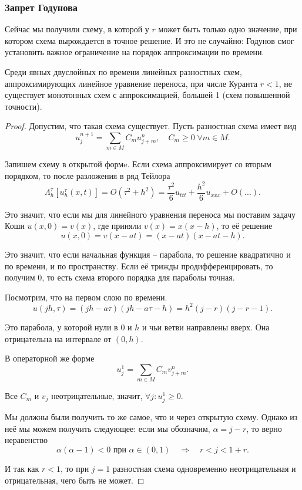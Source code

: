 \documentclass{article}
\begin{document}
\subsubsection{Запрет Годунова}
Сейчас мы получили схему, в которой у $r$ может быть только одно значение, при
котором схема вырождается в точное решение. И это не случайно: Годунов смог
установить важное ограничение на порядок аппроксимации по времени.

\begin{theorem}
	Среди явных двуслойных по времени линейных разностных схем,
	аппроксимирующих линейное уравнение переноса, при числе Куранта
	$r<1$, не существует монотонных схем с аппроксимацией, большей 1
	(схем повышенной точности).
\end{theorem}

\begin{proof}
	Допустим, что такая схема существует. Пусть разностная схема имеет вид
	\[u_j^{n+1}=\sum_{m\in M}C_m u_{j+m}^n,\quad C_m\ge 0\;\forall m\in M.\]

	Запишем схему в открытой формe. Если схема аппроксимирует со вторым
	порядком, то после разложения в ряд Тейлора
	\[\Lambda_h^\tau[u_h^\tau(x,t)]=O(\tau^2+h^2)=
	\frac{\tau^2}{6}u_{ttt}+\frac{h^2}{6}u_{xxx}+O(...).\]

	Это значит, что если мы для линейного уравнения переноса мы поставим
	задачу Коши $u(x,0)=v(x)$, где приняли $v(x)=x(x-h)$, то её решение
	\[u(x,0)=v(x-at)=(x-at)(x-at-h).\]

	Это значит, что если начальная функция -- парабола, то решение
	квадратично и по времени, и по пространству. Если её трижды
	продифференцировать, то получим 0, то есть схема второго порядка для
	параболы точная.

	Посмотрим, что на первом слою по времени.
	\[u(jh,\tau)=(jh-a\tau)(jh-a\tau-h)=h^2(j-r)(j-r-1).\]

	Это парабола, у которой нули в 0 и $h$ и чьи ветви направлены вверх. Она
	отрицательна на интервале от $(0,h)$.

	В операторной же форме
	\[u_j^1=\sum_{m\in M}C_m v_{j+m}^n.\]

	Все $C_m$ и $v_j$ неотрицательные, значит, $\forall j:u_j^1\ge 0$.

	Мы должны были получить то же самое, что и через открытую схему. Однако
	из неё мы можем получить следующее: если мы обозначим, $\alpha=j-r$, то
	верно неравенство
	\[\alpha(\alpha-1)<0\text{ при }\alpha\in(0,1)\quad\Rightarrow\quad
	r<j<1+r.\]

	И так как $r<1$, то при $j=1$ разностная схема одновременно
	неотрицательная и отрицательная, чего быть не может.
\end{proof}
\end{document}
